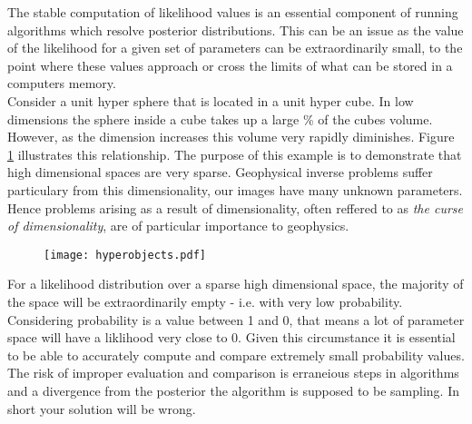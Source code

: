 \begin{tcolorbox}[enhanced jigsaw,breakable,pad at break*=1mm,title=Technical figure 3: Stable computation of likelihood values, title filled,fonttitle=\sffamily\bfseries,fontupper=\sffamily\scriptsize]
\label{Box2}

\begin{multicols}{2}

The stable computation of likelihood values is an essential component of running algorithms which resolve posterior distributions. This can be an issue as the value of the likelihood for a given set of parameters can be extraordinarily small, to the point where these values approach or cross the limits of what can be stored in a computers memory. \\

Consider a unit hyper sphere that is located in a unit hyper cube. In low dimensions the sphere inside a cube takes up a large \% of the cubes volume. However, as the dimension increases this volume very rapidly diminishes. Figure \ref{hyper-objects} illustrates this relationship. The purpose of this example is to demonstrate that high dimensional spaces are very sparse. Geophysical inverse problems suffer particulary from this dimensionality, our images have many unknown parameters. Hence problems arising as a result of dimensionality, often reffered to as \textit{the curse of dimensionality}, are of particular importance to geophysics. \\

\begin{figure}[H]
	\centering
	\texttt{[image: hyperobjects.pdf]}
	\label{hyper-objects}
\end{figure}

For a likelihood distribution over a sparse high dimensional space, the majority of the space will be extraordinarily empty - i.e. with very low probability. Considering probability is a value between 1 and 0, that means a lot of parameter space will have a liklihood very close to 0. Given this circumstance it is essential to be able to accurately compute and compare extremely small probability values. The risk of improper evaluation and comparison is erraneious steps in algorithms and a divergence from the posterior the algorithm is supposed to be sampling. In short your solution will be wrong. \\


\end{multicols}
\end{tcolorbox}
